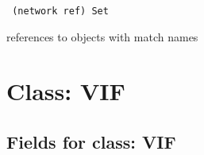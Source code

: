 \vspace{0.3cm}

{\tt 
(network ref) Set
}


references to objects with match names
\vspace{0.3cm}
\vspace{0.3cm}
\vspace{0.3cm}

\vspace{1cm}
\newpage
\section{Class: VIF}
\subsection{Fields for class: VIF}

